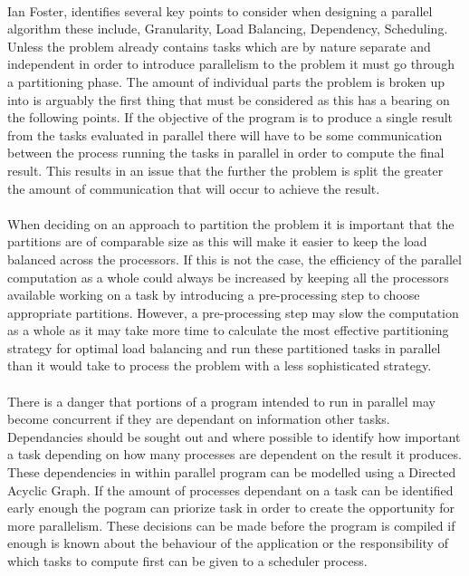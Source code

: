\documentclass[main.tex]{subfiles}
\begin{document}
\paragraph{}Ian Foster\cite{Foster1995}, identifies several key points to consider when designing a parallel algorithm these include, Granularity, Load Balancing, Dependency, Scheduling. Unless the problem already contains tasks which are by nature separate and independent in order to introduce parallelism to the problem it must go through a partitioning phase. The amount of individual parts the problem is broken up into is arguably the first thing that must be considered as this has a bearing on the following points. If the objective of the program is to produce a single result from the tasks evaluated in parallel there will have to be some communication between the process running the tasks in parallel in order to compute the final result. This results in an issue that the further the problem is split the greater the amount of communication that will occur to achieve the result. 

\paragraph{}When deciding on an approach to partition the problem it is important that the partitions are of comparable size as this will make it easier to keep the load balanced across the processors. If this is not the case, the efficiency of the parallel computation as a whole could always be increased by keeping all the processors available working on a task by introducing a pre-processing step to choose appropriate partitions. However, a pre-processing step may slow the computation as a whole as it may take more time to calculate the most effective partitioning strategy for optimal load balancing and run these partitioned tasks in parallel than it would take to process the problem with a less sophisticated strategy.

\paragraph{}There is a danger that portions of a program intended to run in parallel may become concurrent if they are dependant on information other tasks. Dependancies should be sought out and where possible to identify how important a task depending on how many processes are dependent on the result it produces. These dependencies in within parallel program can be modelled using a Directed Acyclic Graph. If the amount of processes dependant on a task can be identified early enough the pogram can priorize task in order to create the opportunity for more parallelism. These decisions can be made before the program is compiled if enough is known about the behaviour of the application or the responsibility of which tasks to compute first can be given to a scheduler process.
\end{document}
